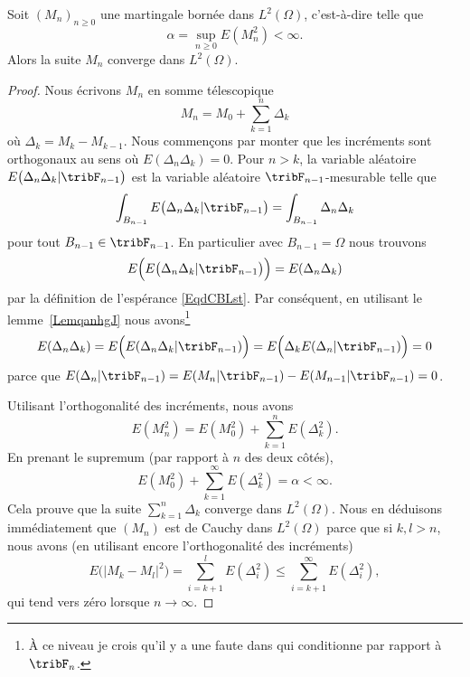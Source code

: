 \begin{theorem}     \label{ThobysyWI}
	Soit \( (M_n)_{n\geq 0}\) une martingale bornée dans \( L^2(\Omega)\), c'est-à-dire telle que
	\begin{equation}
		\alpha=\sup_{n\geq 0}E(M_n^2)<\infty.
	\end{equation}
	Alors la suite \( M_n\) converge dans \( L^2(\Omega)\).
\end{theorem}

\begin{proof}
	Nous écrivons \( M_n\) en somme télescopique
	\begin{equation}
		M_n=M_0+\sum_{k=1}^n\Delta_k
	\end{equation}
	où \( \Delta_k=M_k-M_{k-1}\). Nous commençons par monter que les incréments sont orthogonaux au sens où \( E(\Delta_n\Delta_k)=0\). Pour \( n>k\), la variable aléatoire \( E\big( \Delta_n\Delta_k|\tribF_{n-1} \big)\) est la variable aléatoire \( \tribF_{n-1}\)-mesurable telle que
	\begin{equation}
		\int_{B_{n-1}}E\big( \Delta_n\Delta_k|\tribF_{n-1} \big)=\int_{B_{n-1}}\Delta_n\Delta_k
	\end{equation}
	pour tout \( B_{n-1}\in\tribF_{n-1}\). En particulier avec \( B_{n-1}=\Omega\) nous trouvons
	\begin{equation}
		E\Big( E\big( \Delta_n\Delta_k|\tribF_{n-1} \big)\Big)=E(\Delta_n\Delta_k)
	\end{equation}
	par la définition de l'espérance \eqref{EqdCBLst}. Par conséquent, en utilisant le lemme~\ref{LemqanhgJ} nous avons\footnote{À ce niveau je crois qu'il y a une faute dans \cite{PMCmartinLP} qui conditionne par rapport à \( \tribF_n\).}
	\begin{equation}
		E(\Delta_n\Delta_k)=E\Big( E(\Delta_n\Delta_k|\tribF_{n-1}) \Big)=E\Big( \Delta_kE(\Delta_n|\tribF_{n-1}) \Big)=0
	\end{equation}
	parce que \( E(\Delta_n|\tribF_{n-1})=E(M_n|\tribF_{n-1})-E(M_{n-1}|\tribF_{n-1})=0\).

	Utilisant l'orthogonalité des incréments, nous avons
	\begin{equation}
		E(M_n^2)=E(M_0^2)+\sum_{k=1}^nE(\Delta_k^2).
	\end{equation}
	En prenant le supremum (par rapport à \( n\) des deux côtés),
	\begin{equation}
		E(M_0^2)+\sum_{k=1}^{\infty}E(\Delta_k^2)=\alpha<\infty.
	\end{equation}
	Cela prouve que la suite \( \sum_{k=1}^n\Delta_k\) converge dans \( L^2(\Omega)\). Nous en déduisons immédiatement que \( (M_n)\) est de Cauchy dans \( L^2(\Omega)\) parce que si \( k,l>n\), nous avons (en utilisant encore l'orthogonalité des incréments)
	\begin{equation}
		E\big( | M_k-M_l |^2 \big)=\sum_{i=k+1}^lE(\Delta_i^2)\leq\sum_{i=k+1}^{\infty}E(\Delta_i^2),
	\end{equation}
	qui tend vers zéro lorsque \( n\to\infty\).
\end{proof}

